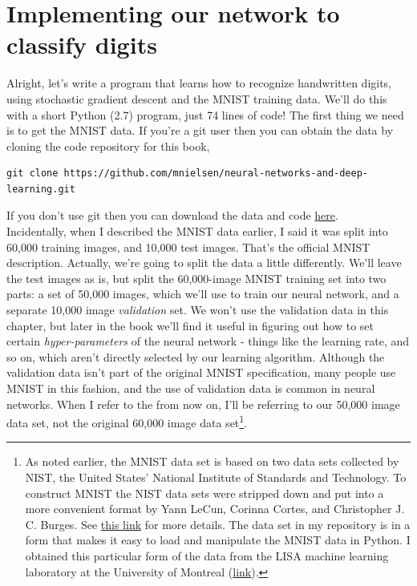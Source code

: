 \section{Implementing our network to classify digits}
\label{sec: Implementing our network to classify digits}

Alright, let's write a program that learns how to recognize handwritten digits, using stochastic gradient descent and the MNIST training data. We'll do this with a short Python (2.7) program, just 74 lines of code! The first thing we need is to get the MNIST data. If you're a git user then you can obtain the data by cloning the code repository for this book,

\begin{lstlisting}
git clone https://github.com/mnielsen/neural-networks-and-deep-learning.git
\end{lstlisting}

If you don't use git then you can download the data and code \href{https://github.com/mnielsen/neural-networks-and-deep-learning/archive/master.zip}{here}.\\

Incidentally, when I described the MNIST data earlier, I said it was split into 60,000 training images, and 10,000 test images. That's the official MNIST description. Actually, we're going to split the data a little differently. We'll leave the test images as is, but split the 60,000-image MNIST training set into two parts: a set of 50,000 images, which we'll use to train our neural network, and a separate 10,000 image \textit{validation} set. We won't use the validation data in this chapter, but later in the book we'll find it useful in figuring out how to set certain \textit{hyper-parameters} of the neural network - things like the learning rate, and so on, which aren't directly selected by our learning algorithm. Although the validation data isn't part of the original MNIST specification, many people use MNIST in this fashion, and the use of validation data is common in neural networks. When I refer to the  from now on, I'll be referring to our 50,000 image data set, not the original 60,000 image data set\footnote{As noted earlier, the MNIST data set is based on two data sets collected by NIST, the United States' National Institute of Standards and Technology. To construct MNIST the NIST data sets were stripped down and put into a more convenient format by Yann LeCun, Corinna Cortes, and Christopher J. C. Burges. See \href{http://yann.lecun.com/exdb/mnist/}{this link} for more details. The data set in my repository is in a form that makes it easy to load and manipulate the MNIST data in Python. I obtained this particular form of the data from the LISA machine learning laboratory at the University of Montreal (\href{http://www.deeplearning.net/tutorial/gettingstarted.html}{link}).}.\\

